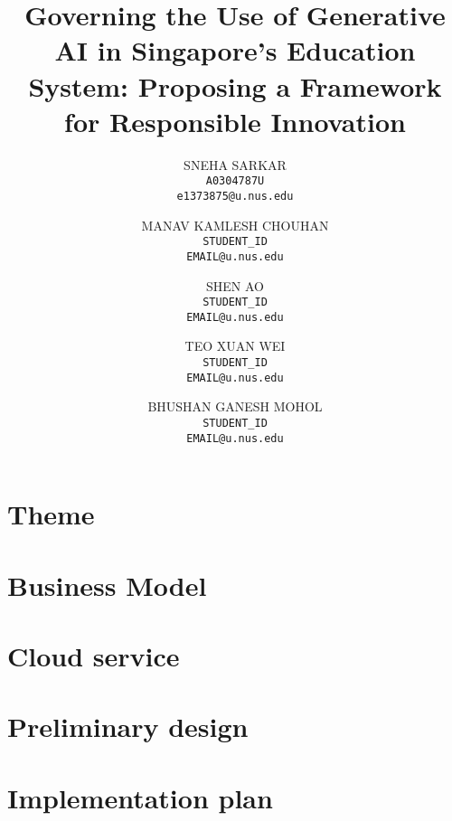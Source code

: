 \documentclass[11pt]{article}
\title{Governing the Use of Generative AI in Singapore's Education System: Proposing a Framework for Responsible Innovation
}
\author{
    \begin{tabular}[t]{l}
        SNEHA SARKAR \\
        \texttt{A0304787U} \\
        \texttt{e1373875@u.nus.edu} \\
    \end{tabular}
    \and
    \begin{tabular}[t]{l}
        MANAV KAMLESH CHOUHAN \\
        \texttt{STUDENT\_ID} \\
        \texttt{EMAIL@u.nus.edu} \\
    \end{tabular}
    \and
    \begin{tabular}[t]{l}
        SHEN AO \\
        \texttt{STUDENT\_ID} \\
        \texttt{EMAIL@u.nus.edu} \\
    \end{tabular}
    \and
    \begin{tabular}[t]{l}
        TEO XUAN WEI \\
        \texttt{STUDENT\_ID} \\
        \texttt{EMAIL@u.nus.edu} \\
    \end{tabular}
    \and
    \begin{tabular}[t]{l}
        BHUSHAN GANESH MOHOL \\
        \texttt{STUDENT\_ID} \\
        \texttt{EMAIL@u.nus.edu}
    \end{tabular}
}
\begin{document}
\maketitle

\section{Theme}
\section{Business Model}
\section{Cloud service}
\section{Preliminary design}
\section{Implementation plan}
\end{document}
